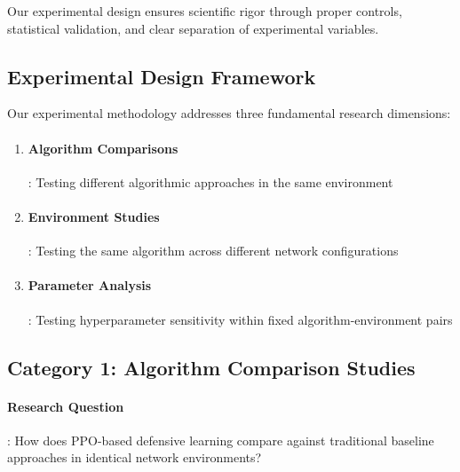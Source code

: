 \documentclass[12pt,oneside]{article}
\begin{document}
Our experimental design ensures scientific rigor through proper controls, statistical validation, and clear separation of experimental variables.

\subsection{Experimental Design Framework}

Our experimental methodology addresses three fundamental research dimensions:

\begin{enumerate}
\item \paragraph{Algorithm Comparisons}: Testing different algorithmic approaches in the same environment
\item \paragraph{Environment Studies}: Testing the same algorithm across different network configurations  
\item \paragraph{Parameter Analysis}: Testing hyperparameter sensitivity within fixed algorithm-environment pairs
\end{enumerate}

\subsection{Category 1: Algorithm Comparison Studies}

\paragraph{Research Question}: How does PPO-based defensive learning compare against traditional baseline approaches in identical network environments?
\end{document}

